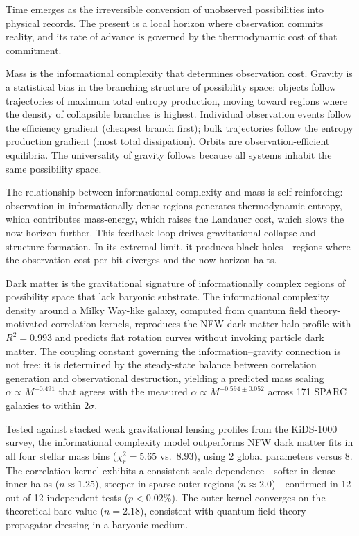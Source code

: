 \documentclass[12pt,a4paper]{article}
\begin{document}
Time emerges as the irreversible conversion of unobserved possibilities into physical records. The present is a local horizon where observation commits reality, and its rate of advance is governed by the thermodynamic cost of that commitment.

Mass is the informational complexity that determines observation cost. Gravity is a statistical bias in the branching structure of possibility space: objects follow trajectories of maximum total entropy production, moving toward regions where the density of collapsible branches is highest. Individual observation events follow the efficiency gradient (cheapest branch first); bulk trajectories follow the entropy production gradient (most total dissipation). Orbits are observation-efficient equilibria. The universality of gravity follows because all systems inhabit the same possibility space.

The relationship between informational complexity and mass is self-reinforcing: observation in informationally dense regions generates thermodynamic entropy, which contributes mass-energy, which raises the Landauer cost, which slows the now-horizon further. This feedback loop drives gravitational collapse and structure formation. In its extremal limit, it produces black holes---regions where the observation cost per bit diverges and the now-horizon halts.

Dark matter is the gravitational signature of informationally complex regions of possibility space that lack baryonic substrate. The informational complexity density around a Milky Way-like galaxy, computed from quantum field theory-motivated correlation kernels, reproduces the NFW dark matter halo profile with $R^2 = 0.993$ and predicts flat rotation curves without invoking particle dark matter. The coupling constant governing the information--gravity connection is not free: it is determined by the steady-state balance between correlation generation and observational destruction, yielding a predicted mass scaling $\alpha \propto M^{-0.491}$ that agrees with the measured $\alpha \propto M^{-0.594 \pm 0.052}$ across 171 SPARC galaxies to within $2\sigma$.

Tested against stacked weak gravitational lensing profiles from the KiDS-1000 survey, the informational complexity model outperforms NFW dark matter fits in all four stellar mass bins ($\chi^2_r = 5.65$ vs.\ $8.93$), using 2 global parameters versus 8. The correlation kernel exhibits a consistent scale dependence---softer in dense inner halos ($n \approx 1.25$), steeper in sparse outer regions ($n \approx 2.0$)---confirmed in 12 out of 12 independent tests ($p < 0.02\%$). The outer kernel converges on the theoretical bare value ($n = 2.18$), consistent with quantum field theory propagator dressing in a baryonic medium.
\end{document}
